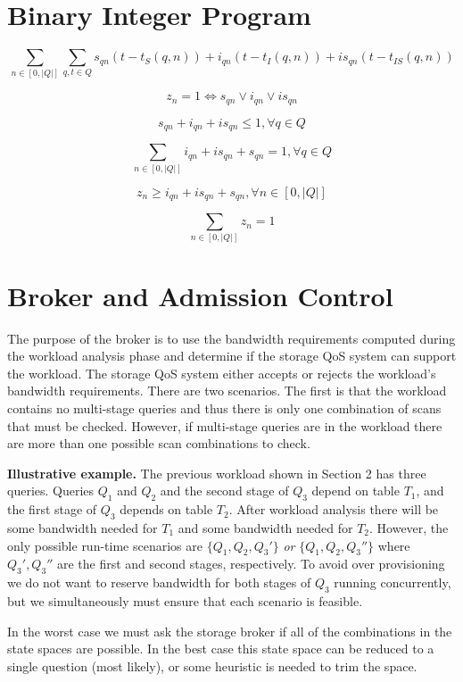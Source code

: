 \documentclass{sig-alternate}
\begin{document}
\section{Binary Integer Program}

\[
\sum_{n \in [0,|Q|]} \sum_{q,t \in Q} s_{qn} (t - t_S(q,n)) + i_{qn} (t -
t_I(q,n)) + is_{qn} (t - t_{IS}(q,n))
\]

\[
z_n = 1 \iff s_{qn} \vee i_{qn} \vee is_{qn}
\]

\[
s_{qn} + i_{qn} + is_{qn} \le 1, \forall q \in Q
\]

\[
\sum_{n \in [0, |Q|]} i_{qn} + is_{qn} + s_{qn} = 1, \forall q \in Q
\]

\[
z_n \ge i_{qn} + is_{qn} + s_{qn}, \forall n \in [0, |Q|]
\]

\[
\sum_{n \in [0, |Q|]} z_n = 1
\]

\section{Broker and Admission Control}

The purpose of the broker is to use the bandwidth requirements computed during
the workload analysis phase and determine if the storage QoS system can
support the workload. The storage QoS system either accepts or rejects the
workload's bandwidth requirements. There are two scenarios. The first is that
the workload contains no multi-stage queries and thus there is only one
combination of scans that must be checked. However, if multi-stage queries are
in the workload there are more than one possible scan combinations to check.

{\bf Illustrative example.} The previous workload shown in Section 2 has three
queries. Queries $Q_1$ and $Q_2$ and the second stage of $Q_3$ depend on table
$T_1$, and the first stage of $Q_3$ depends on table $T_2$. After workload
analysis there will be some bandwidth needed for $T_1$ and some bandwidth
needed for $T_2$. However, the only possible run-time scenarios are $\{Q_1,
Q_2, Q_3'\}$ \emph{or} $\{Q_1, Q_2, Q_3''\}$ where $Q_3', Q_3''$ are the first
and second stages, respectively. To avoid over provisioning we do not want to
reserve bandwidth for both stages of $Q_3$ running concurrently, but we
simultaneously must ensure that each scenario is feasible.

In the worst case we must ask the storage broker if all of the combinations in
the state spaces are possible. In the best case this state space can be
reduced to a single question (most likely), or some heuristic is needed to
trim the space.



\end{document}
